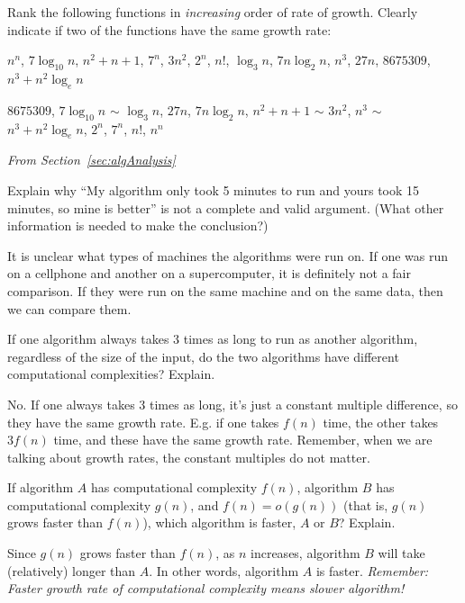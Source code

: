 \begin{requ}
Rank the following functions in {\em increasing} order of rate of growth. Clearly indicate if two
of the functions have the same growth rate:

\medskip
$n^n$,
$7 \log_{10} n$,
$n^2+n+1$,
$7^n$,
$3n^2$,
$2^n$,
$n!$,
$\log_3 n$,
$7n\log_2 n$,
$n^3$,
$27 n$,
$8675309$, 
$n^3+n^2\log_{e} n$
\begin{requanswer}
$8675309$, 
$7 \log_{10} n$ $\sim$ $\log_3 n$,
$27 n$,
$7n\log_2 n$,
$n^2+n+1$ $\sim$ $3n^2$,
$n^3$ $\sim$ $n^3+n^2\log_{e} n$,
$2^n$,
$7^n$,
$n!$,
$n^n$
\end{requanswer}
\end{requ}

\noindent
{\em From Section~\ref{sec:algAnalysis}}

\begin{requ}
Explain why ``My algorithm only took 5 minutes to run and yours took 15 minutes, so mine is better'' is not
a complete and valid argument. (What other information is needed to make the conclusion?)
\begin{requanswer}
It is unclear what types of machines the algorithms were run on. If one was run on a cellphone and another
on a supercomputer, it is definitely not a fair comparison. 
If they were run on the same machine and on the same data, then we can compare them.
\end{requanswer}
\end{requ}

\begin{requ}
If one algorithm always takes 3 times as long to run as another algorithm, 
regardless of the size of the input,
do the two algorithms have different computational complexities? Explain.
\begin{requanswer}
No. If one always takes 3 times as long, it's just a constant multiple difference, so they have
the same growth rate. E.g. if one takes $f(n)$ time, the other takes $3f(n)$ time, and these
have the same growth rate.
Remember, when we are talking about growth rates, the constant multiples do not matter.
\end{requanswer}
\end{requ}

\begin{requ}
If algorithm $A$ has computational complexity $f(n)$, 
algorithm $B$ has computational complexity $g(n)$, and $f(n)=o(g(n))$ (that is, $g(n)$ grows faster than $f(n)$),
which algorithm is faster, $A$ or $B$? Explain.
\begin{requanswer}
Since $g(n)$ grows faster than $f(n)$, as $n$ increases, algorithm $B$ will take (relatively) longer than $A$.
In other words, algorithm $A$ is faster.
{\em Remember: Faster growth rate of computational complexity means slower algorithm!}
\end{requanswer}
\end{requ}

